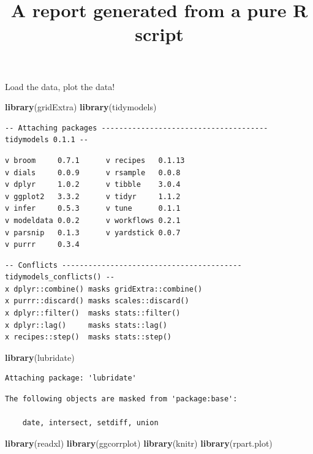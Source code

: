 \documentclass[
]{article}
\title{A report generated from a pure R script}
\author{}
\date{\vspace{-2.5em}}
\newenvironment{Shaded}{\begin{snugshade}}{\end{snugshade}}
\newcommand{\KeywordTok}[1]{\textcolor[rgb]{0.13,0.29,0.53}{\textbf{#1}}}
\newcommand{\NormalTok}[1]{#1}
\begin{document}
\maketitle

Load the data, plot the data!

\begin{Shaded}
\begin{Highlighting}[]
\KeywordTok{library}\NormalTok{(gridExtra)}
\KeywordTok{library}\NormalTok{(tidymodels)}
\end{Highlighting}
\end{Shaded}

\begin{verbatim}
-- Attaching packages -------------------------------------- tidymodels 0.1.1 --
\end{verbatim}

\begin{verbatim}
v broom     0.7.1      v recipes   0.1.13
v dials     0.0.9      v rsample   0.0.8 
v dplyr     1.0.2      v tibble    3.0.4 
v ggplot2   3.3.2      v tidyr     1.1.2 
v infer     0.5.3      v tune      0.1.1 
v modeldata 0.0.2      v workflows 0.2.1 
v parsnip   0.1.3      v yardstick 0.0.7 
v purrr     0.3.4      
\end{verbatim}

\begin{verbatim}
-- Conflicts ----------------------------------------- tidymodels_conflicts() --
x dplyr::combine() masks gridExtra::combine()
x purrr::discard() masks scales::discard()
x dplyr::filter()  masks stats::filter()
x dplyr::lag()     masks stats::lag()
x recipes::step()  masks stats::step()
\end{verbatim}

\begin{Shaded}
\begin{Highlighting}[]
\KeywordTok{library}\NormalTok{(lubridate)}
\end{Highlighting}
\end{Shaded}

\begin{verbatim}
Attaching package: 'lubridate'
\end{verbatim}

\begin{verbatim}
The following objects are masked from 'package:base':

    date, intersect, setdiff, union
\end{verbatim}

\begin{Shaded}
\begin{Highlighting}[]
\KeywordTok{library}\NormalTok{(readxl)}
\KeywordTok{library}\NormalTok{(ggcorrplot)}
\KeywordTok{library}\NormalTok{(knitr)}
\KeywordTok{library}\NormalTok{(rpart.plot)}
\end{Highlighting}
\end{Shaded}
\end{document}
